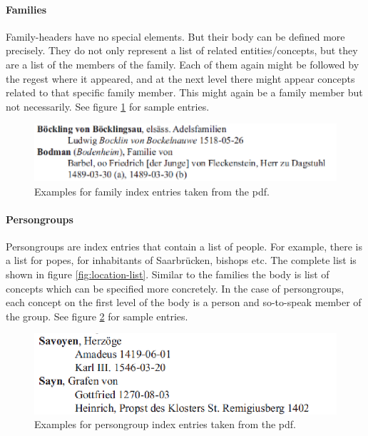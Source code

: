 \paragraph{Families}
Family-headers have no special elements. But their body can be defined more precisely. They do not only represent a list of related entities/concepts, but they are a list of the members of the family. Each of them again might be followed by the regest where it appeared, and at the next level there might appear concepts related to that specific family member. This might again be a family member but not necessarily.
See figure \ref{fig:family-example} for sample entries.

\begin{figure}[h]
  \centering
  \includegraphics[scale=0.45]{img/family-example}
  \caption{Examples for family index entries taken from the pdf.}
  \label{fig:family-example}
\end{figure}

\paragraph{Persongroups}
Persongroups are index entries that contain a list of people. For example, there is a list for popes, for inhabitants of Saarbrücken, bishops etc. The complete list is shown in figure \ref{fig:location-list}. 
Similar to the families the body is list of concepts which can be specified more concretely. In the case of persongroups, each concept on the first level of the body is a person and so-to-speak member of the group. See figure \ref{fig:persongroup-example} for sample entries.

\begin{figure}[h]
  \centering
  \includegraphics[scale=0.45]{img/persongroup-example}
  \caption{Examples for persongroup index entries taken from the pdf.}
  \label{fig:persongroup-example}
\end{figure}

